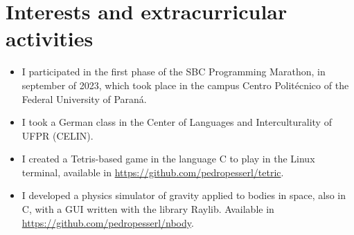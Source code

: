 \documentclass[a4paper, 12pt]{moderncv}
\begin{document}
\section{Interests and extracurricular activities}
\vspace{4pt}
\begin{itemize}
    \item{I participated in the first phase of the SBC Programming Marathon, in
        september of 2023, which took place in the campus Centro Politécnico of
    the Federal University of Paraná.}
    \vspace{4pt}
    \item{I took a German class in the Center of Languages and Interculturality of
        UFPR (CELIN).}
    \vspace{4pt}
    \item{I created a Tetris-based game in the language C to play in the Linux
        terminal, available in \url{https://github.com/pedropesserl/tetric}.}
    \vspace{4pt}
    \item{I developed a physics simulator of gravity applied to bodies in
        space, also in C, with a GUI written with the library Raylib. Available
    in \url{https://github.com/pedropesserl/nbody}.}
\end{itemize}
\end{document}
